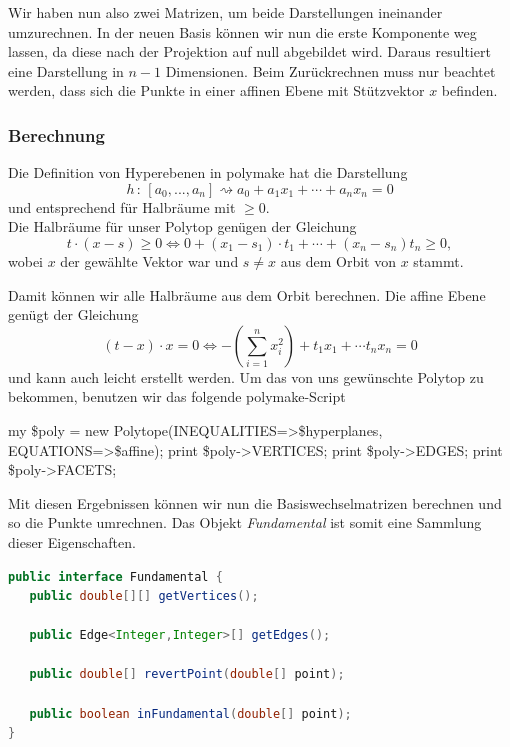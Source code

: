          Wir haben nun also zwei Matrizen, um beide Darstellungen ineinander umzurechnen. In der neuen Basis können wir nun die erste Komponente weg lassen, da diese nach der Projektion auf null abgebildet wird. Daraus resultiert eine Darstellung in $n-1$ Dimensionen.
         Beim Zurückrechnen muss nur beachtet werden, dass sich die Punkte in einer affinen Ebene mit Stützvektor $x$ befinden.

        \subsubsection*{Berechnung}

         Die Definition von Hyperebenen in polymake hat die Darstellung
         $$
            h \, : \, [a_0, ..., a_n] \rightsquigarrow a_0 + a_1 x_1 + \cdots + a_n x_n = 0
         $$
         und entsprechend für Halbräume mit $\geq 0$.\\

         \noindent Die Halbräume für unser Polytop genügen der Gleichung
         $$
            t \cdot (x - s) \geq 0 \Leftrightarrow 0 + (x_1-s_1)\cdot t_1 + \cdots + (x_n -s_n)t_n \geq 0,
         $$
         wobei $x$ der gewählte Vektor war und $s \not= x$ aus dem Orbit von $x$ stammt.

         \noindent Damit können wir alle Halbräume aus dem Orbit berechnen. Die affine Ebene genügt der Gleichung
         $$
            (t - x) \cdot x = 0 \Leftrightarrow - \left( \sum_{i=1}^n x_i^2 \right) + t_1 x_1 + \cdots t_n x_n = 0
         $$
         und kann auch leicht erstellt werden. Um das von uns gewünschte Polytop zu bekommen, benutzen wir das folgende polymake-Script

         \begin{code}
my \$poly = new Polytope(INEQUALITIES=>\$hyperplanes, EQUATIONS=>\$affine);
print \$poly->VERTICES;
print \$poly->EDGES;
print \$poly->FACETS;
         \end{code}

         \noindent Mit diesen Ergebnissen können wir nun die Basiswechselmatrizen berechnen und so die Punkte umrechnen. Das Objekt \emph{Fundamental} ist somit
         eine Sammlung dieser Eigenschaften.
         
\begin{lstlisting}[language=Java, caption={Ausschnitt aus dem Fundamental-Interface}, label=fund:interface]
public interface Fundamental {
   public double[][] getVertices();
               
   public Edge<Integer,Integer>[] getEdges();

   public double[] revertPoint(double[] point);

   public boolean inFundamental(double[] point);
}
\end{lstlisting}
         
